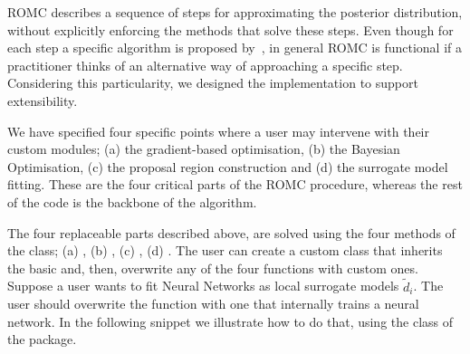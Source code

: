 ROMC describes a sequence of steps for approximating the posterior
distribution, without explicitly enforcing the methods that solve
these steps. Even though for each step a specific algorithm is
proposed by~\cite{Ikonomov2019}, in general ROMC is functional if a
practitioner thinks of an alternative way of approaching a specific
step. Considering this particularity, we designed the implementation
to support extensibility.

We have specified four specific points where a user may intervene with
their custom modules; (a) the gradient-based optimisation, (b) the
Bayesian Optimisation, (c) the proposal region construction and (d)
the surrogate model fitting. These are the four critical parts of the
ROMC procedure, whereas the rest of the code is the backbone of the
algorithm.

The four replaceable parts described above, are solved using the four
methods of the \linebreak {} class; (a)
, (b) ,
\linebreak (c) , (d)
. The user can create a custom
class that inherits the basic  and, then,
overwrite any of the four functions with custom ones. Suppose a user
wants to fit Neural Networks as local surrogate models
\(\tilde{d}_i\). The user should overwrite the
 function with one that internally
trains a neural network. In the following snippet we illustrate how to
do that, using the  class of the
 package.

